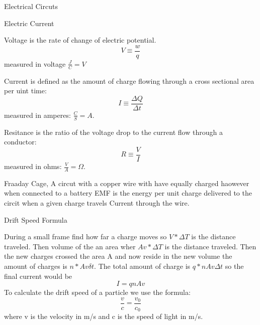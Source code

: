 \documentclass{article}
\newcommand\hr{\par\vspace{-.5\ht\strutbox}\noindent\hrulefill\par}
\newcommand\br{\vspace{0.5cm}}
\begin{document}
\Huge \raggedright Electrical Circuts \\ \vspace{1cm}
    \hr
    \LARGE \center Electric Current \\
    \br
    \begin{large}
    \raggedright 
    Voltage is the rate of change of electric potential. \\ 
    \[ V \equiv\frac{w}{q}\] measured in voltage $\frac{J}{C} = V$
    
    Current is defined as the amount of charge flowing through a cross sectional area per uint time: 
    \[ I \equiv \frac{\Delta Q}{\Delta t}\] measured in amperes:  $\frac{C}{S} = A$.
    
    Resitance is the ratio of the voltage drop to the current flow through a conductor:
    \[ R \equiv \frac{V}{I}\] measured in ohms: $\frac{V}{A} = \Omega$.
    
    Fraaday Cage, A circut with a copper wire with have equally charged haowever when connected to a battery EMF is the energy per unit charge delivered to the circit when a given charge travels 
    Current through the wire. 
    \end{large}
    \LARGE \center Drift Speed Formula \\
    \br
    \begin{large}
    \raggedright
    During a small frame find how far a charge moves so $V*\Delta T$ is the distance traveled. Then volume of the an area wher $Av*\Delta T$ is the distance traveled. Then the new charges crossed the area A and now reside in the new volume the amount of charges is $n*Av\delta t$. The total amount of charge is $q*nAv\Delta t$ so the final current would be \[I = qnAv\]
    To calculate the drift speed of a particle we use the formula:
    \[ \frac{v}{c} = \frac{v_0}{c_0} \]
    where v is the velocity in m/s and c is the speed of light in m/s.
    
    \end{large}

    
\end{document}
